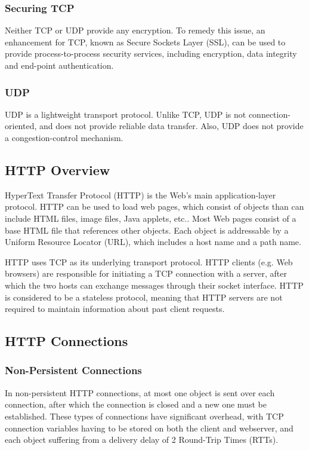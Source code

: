 \documentclass[12pt,titlepage]{article}
\begin{document}
        \subsubsection{Securing TCP}
          Neither TCP or UDP provide any encryption. To remedy this issue, an enhancement for TCP, known as Secure Sockets Layer (SSL), can be used to provide process-to-process
          security services, including encryption, data integrity and end-point authentication.

      \subsubsection{UDP}
        UDP is a lightweight transport protocol. Unlike TCP, UDP is not connection-oriented, and does not provide reliable data transfer. Also, UDP does not provide a
        congestion-control mechanism.

    \subsection{HTTP Overview}
      HyperText Transfer Protocol (HTTP) is the Web's main application-layer protocol. HTTP can be used to load web pages, which consist of objects than can include HTML files,
      image files, Java applets, etc.. Most Web pages consist of a base HTML file that references other objects. Each object is addressable by a Uniform Resource Locator (URL),
      which includes a host name and a path name.

      HTTP uses TCP as its underlying transport protocol. HTTP clients (e.g. Web browsers) are responsible for initiating a TCP connection with a server, after which the two hosts
      can exchange messages through their socket interface. HTTP is considered to be a stateless protocol, meaning that HTTP servers are not required to maintain information about
      past client requests.

    \subsection{HTTP Connections}

      \subsubsection{Non-Persistent Connections}
        In non-persistent HTTP connections, at most one object is sent over each connection, after which the connection is closed and a new one must be established. These types of
        connections have significant overhead, with TCP connection variables having to be stored on both the client and webserver, and each object suffering from a delivery delay
        of 2 Round-Trip Times (RTTs).
\end{document}
